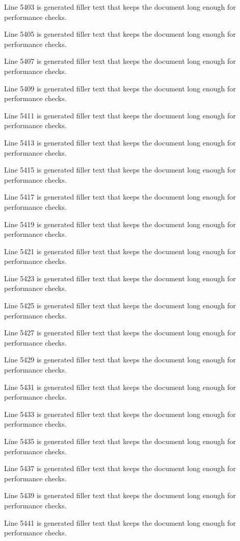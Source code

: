 Line 5403 is generated filler text that keeps the document long enough for performance checks.

Line 5405 is generated filler text that keeps the document long enough for performance checks.

Line 5407 is generated filler text that keeps the document long enough for performance checks.

Line 5409 is generated filler text that keeps the document long enough for performance checks.

Line 5411 is generated filler text that keeps the document long enough for performance checks.

Line 5413 is generated filler text that keeps the document long enough for performance checks.

Line 5415 is generated filler text that keeps the document long enough for performance checks.

Line 5417 is generated filler text that keeps the document long enough for performance checks.

Line 5419 is generated filler text that keeps the document long enough for performance checks.

Line 5421 is generated filler text that keeps the document long enough for performance checks.

Line 5423 is generated filler text that keeps the document long enough for performance checks.

Line 5425 is generated filler text that keeps the document long enough for performance checks.

Line 5427 is generated filler text that keeps the document long enough for performance checks.

Line 5429 is generated filler text that keeps the document long enough for performance checks.

Line 5431 is generated filler text that keeps the document long enough for performance checks.

Line 5433 is generated filler text that keeps the document long enough for performance checks.

Line 5435 is generated filler text that keeps the document long enough for performance checks.

Line 5437 is generated filler text that keeps the document long enough for performance checks.

Line 5439 is generated filler text that keeps the document long enough for performance checks.

Line 5441 is generated filler text that keeps the document long enough for performance checks.

